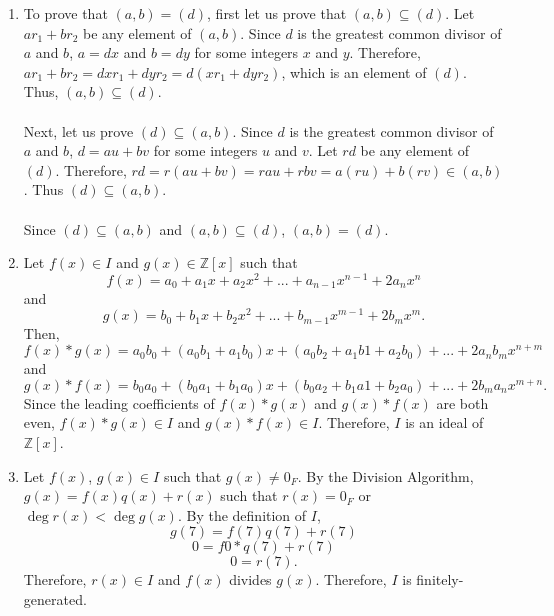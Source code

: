 \documentclass{article}
\begin{document}
\begin{enumerate}
\begin{enumerate}
\end{enumerate}

\item To prove that $(a,b) = (d)$, first let us prove that $(a,b) \subseteq (d)$.
Let $ar_1 + br_2$ be any element of $(a,b)$.  Since $d$ is the greatest common
divisor of $a$ and $b$, $a = dx$ and $b = dy$ for some integers $x$ and $y$.
Therefore, $ar_1 + br_2 = dxr_1 + dyr_2 = d(xr_{1} + dyr_{2})$, which is an
element of $(d)$.  Thus, $(a,b) \subseteq (d)$. \\ \\
Next, let us prove $(d) \subseteq (a,b)$.  Since $d$ is the greatest common
divisor of $a$ and $b$, $d = au + bv$ for some integers $u$ and $v$.  Let
$rd$ be any element of $(d)$.
Therefore, $rd = r(au + bv) = rau + rbv = a(ru) + b(rv) \in (a,b)$.
Thus $(d) \subseteq (a,b)$. \\ \\
Since $(d) \subseteq (a,b)$ and $(a,b) \subseteq (d)$, $(a,b) = (d)$.

\item
Let $f(x) \in I$ and $g(x) \in \mathbb{Z}[x]$ such that
\[
f(x) = a_{0} + a_{1}x + a_{2}x^{2} + ... + a_{n-1}x^{n-1} + 2a_{n}x^n
\]
and
\[
g(x) = b_{0} + b_{1}x + b_{2}x^{2} + ... + b_{m-1}x^{m-1} + 2b_{m}x^m.
\]
Then,
\[
f(x)*g(x) = a_{0}b_{0} + (a_{0}b_{1} + a_{1}b_{0})x + (a_{0}b_{2}+a_{1}b{1}+a_{2}b_{0}) + ... + 2a_{n}b_{m}x^{n+m}
\]
and
\[
g(x)*f(x) = b_{0}a_{0} + (b_{0}a_{1} + b_{1}a_{0})x + (b_{0}a_{2}+b_{1}a{1}+b_{2}a_{0}) + ... + 2b_{m}a_{n}x^{m+n}.
\]
Since the leading coefficients of $f(x)*g(x)$ and $g(x)*f(x)$ are both even,
$f(x)*g(x) \in I$ and $g(x)*f(x) \in I$.  Therefore, $I$ is an ideal of $\mathbb{Z}[x]$.

\item Let $f(x)$, $g(x) \in I$ such that $g(x) \neq 0_{F}$.
By the Division Algorithm, $g(x) = f(x)q(x) + r(x)$ such that $r(x) = 0_{F}$
or $\deg r(x) < \deg g(x)$.  By the definition of $I$,
\[
g(7) = f(7)q(7) + r(7)
\]
\[
0 = f0*q(7) + r(7)
\]
\[
0 = r(7).
\]
Therefore, $r(x) \in I$ and $f(x)$ divides $g(x)$.  Therefore, $I$ is
finitely-generated.

\end{enumerate}
\end{document}

